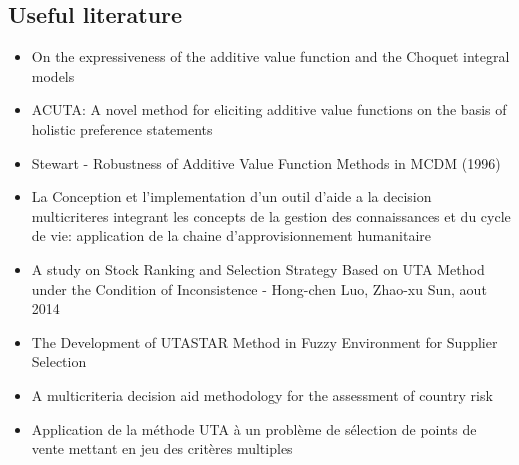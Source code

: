 \documentclass{report}
\begin{document}
\begin{appendices}
\section{Useful literature}
\begin{itemize}
\item On the expressiveness of the additive value function and the Choquet integral models
\item ACUTA: A novel method for eliciting additive value functions on the basis of holistic preference statements
\item Stewart - Robustness of Additive Value Function Methods in MCDM (1996)
\item La Conception et l’implementation d’un outil d’aide a la decision multicriteres integrant les concepts de la gestion des connaissances et du cycle de vie: application de la chaine d’approvisionnement humanitaire
\item A study on Stock Ranking and Selection Strategy Based on UTA Method under the Condition of Inconsistence - Hong-chen Luo, Zhao-xu Sun, aout 2014
\item The Development of UTASTAR Method in Fuzzy Environment for Supplier Selection
\item A multicriteria decision aid methodology for the assessment of country risk
\item Application de la méthode UTA à un problème de sélection de points de vente mettant en jeu des critères multiples
\end{itemize}

\end{appendices}
\end{document}
